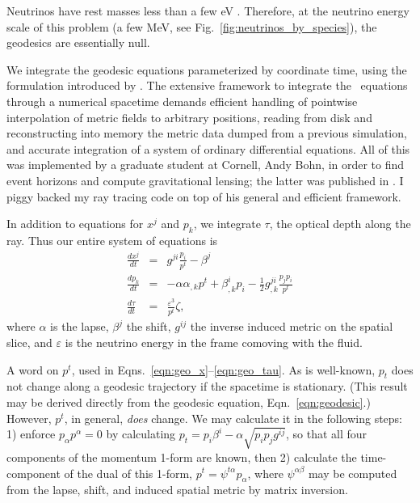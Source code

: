 Neutrinos have rest masses less than a few eV \citep{oliv2014-pdg}.
Therefore, at the neutrino energy scale
of this problem (a few MeV, see Fig.~\ref{fig:neutrinos_by_species}), the
geodesics are essentially null.

We integrate the geodesic equations parameterized by coordinate time,
using the formulation introduced by \cite{hugh1994-eh_finding}.
The extensive framework to integrate the \citeauthor{hugh1994-eh_finding}\
equations through a numerical spacetime demands efficient handling of
pointwise interpolation of metric fields to arbitrary positions, reading from
disk and reconstructing into memory the metric data dumped from a previous
simulation, and accurate integration of a system of ordinary differential
equations.
All of this was implemented by a graduate student at Cornell, Andy Bohn, in order
to find event horizons and compute gravitational lensing; the latter was
published in \cite{bohn2015-lensing}.
I piggy backed my ray tracing code on top of his general and efficient framework.

In addition to equations for $x^j$ and $p_k$, we integrate $\tau$, the optical
depth along the ray. Thus our entire system of equations is
\begin{eqnarray}
  \label{eqn:geo_x}
  \frac{dx^j}{dt} &=& g^{ji}\frac{p_i}{p^t} - \beta^j \\
  \label{eqn:geo_p}
  \frac{dp_k}{dt} &=& -\alpha \alpha_{,k}p^t + \beta^i_{,k}p_i
  - \frac{1}{2}g^{ji}_{,k} \frac{p_jp_i}{p^t} \\
  \label{eqn:geo_tau}
  \frac{d\tau}{dt} &=& \frac{\varepsilon^3}{p^t} \zeta,
\end{eqnarray}
where $\alpha$ is the lapse, $\beta^j$ the shift, $g^{ij}$ the inverse
induced metric on the spatial slice, and $\varepsilon$ is the neutrino
energy in the frame comoving with the fluid.

A word on $p^t$, used in Eqns.~\ref{eqn:geo_x}--\ref{eqn:geo_tau}.
As is well-known, $p_t$ does not change along a geodesic trajectory if the
spacetime is stationary. (This result may be derived directly from the geodesic
equation, Eqn.~\ref{eqn:geodesic}.)
However, $p^t$, in general, \emph{does} change. We may calculate it in the
following steps: 1) enforce $p_\alpha p^\alpha=0$ by calculating
$p_t=p_i\beta^i-\alpha\sqrt{p_ip_jg^{ij}}$, so that all four components of the
momentum 1-form are known, then 2) calculate the time-component of the dual of
this 1-form, $p^t=\psi^{t\alpha}p_\alpha$, where $\psi^{\alpha\beta}$ may be
computed from the lapse, shift, and induced spatial metric by matrix inversion.

